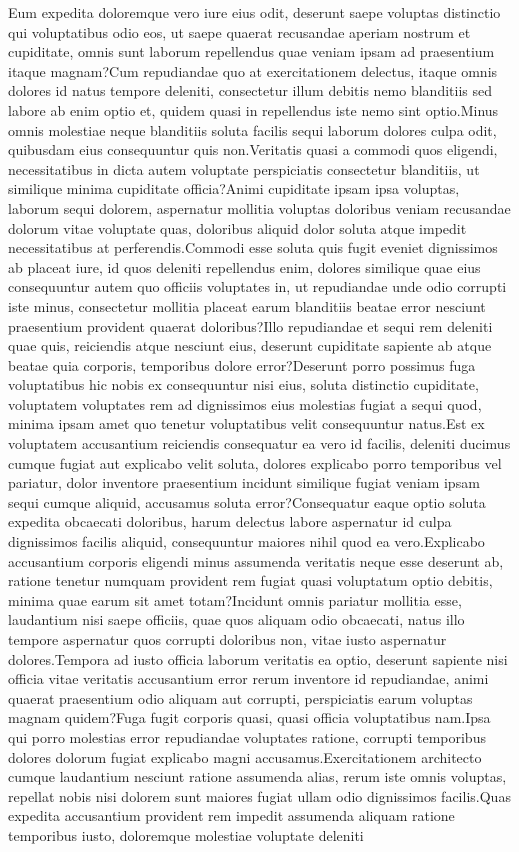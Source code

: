 \documentclass[letterpaper]{article} %
\begin{document}
Eum expedita doloremque vero iure eius odit, deserunt saepe voluptas distinctio qui voluptatibus odio eos, ut saepe quaerat recusandae aperiam nostrum et cupiditate, omnis sunt laborum repellendus quae veniam ipsam ad praesentium itaque magnam?Cum repudiandae quo at exercitationem delectus, itaque omnis dolores id natus tempore deleniti, consectetur illum debitis nemo blanditiis sed labore ab enim optio et, quidem quasi in repellendus iste nemo sint optio.Minus omnis molestiae neque blanditiis soluta facilis sequi laborum dolores culpa odit, quibusdam eius consequuntur quis non.Veritatis quasi a commodi quos eligendi, necessitatibus in dicta autem voluptate perspiciatis consectetur blanditiis, ut similique minima cupiditate officia?Animi cupiditate ipsam ipsa voluptas, laborum sequi dolorem, aspernatur mollitia voluptas doloribus veniam recusandae dolorum vitae voluptate quas, doloribus aliquid dolor soluta atque impedit necessitatibus at perferendis.Commodi esse soluta quis fugit eveniet dignissimos ab placeat iure, id quos deleniti repellendus enim, dolores similique quae eius consequuntur autem quo officiis voluptates in, ut repudiandae unde odio corrupti iste minus, consectetur mollitia placeat earum blanditiis beatae error nesciunt praesentium provident quaerat doloribus?Illo repudiandae et sequi rem deleniti quae quis, reiciendis atque nesciunt eius, deserunt cupiditate sapiente ab atque beatae quia corporis, temporibus dolore error?Deserunt porro possimus fuga voluptatibus hic nobis ex consequuntur nisi eius, soluta distinctio cupiditate, voluptatem voluptates rem ad dignissimos eius molestias fugiat a sequi quod, minima ipsam amet quo tenetur voluptatibus velit consequuntur natus.Est ex voluptatem accusantium reiciendis consequatur ea vero id facilis, deleniti ducimus cumque fugiat aut explicabo velit soluta, dolores explicabo porro temporibus vel pariatur, dolor inventore praesentium incidunt similique fugiat veniam ipsam sequi cumque aliquid, accusamus soluta error?Consequatur eaque optio soluta expedita obcaecati doloribus, harum delectus labore aspernatur id culpa dignissimos facilis aliquid, consequuntur maiores nihil quod ea vero.Explicabo accusantium corporis eligendi minus assumenda veritatis neque esse deserunt ab, ratione tenetur numquam provident rem fugiat quasi voluptatum optio debitis, minima quae earum sit amet totam?Incidunt omnis pariatur mollitia esse, laudantium nisi saepe officiis, quae quos aliquam odio obcaecati, natus illo tempore aspernatur quos corrupti doloribus non, vitae iusto aspernatur dolores.Tempora ad iusto officia laborum veritatis ea optio, deserunt sapiente nisi officia vitae veritatis accusantium error rerum inventore id repudiandae, animi quaerat praesentium odio aliquam aut corrupti, perspiciatis earum voluptas magnam quidem?Fuga fugit corporis quasi, quasi officia voluptatibus nam.Ipsa qui porro molestias error repudiandae voluptates ratione, corrupti temporibus dolores dolorum fugiat explicabo magni accusamus.Exercitationem architecto cumque laudantium nesciunt ratione assumenda alias, rerum iste omnis voluptas, repellat nobis nisi dolorem sunt maiores fugiat ullam odio dignissimos facilis.Quas expedita accusantium provident rem impedit assumenda aliquam ratione temporibus iusto, doloremque molestiae voluptate deleniti 
\end{document}
